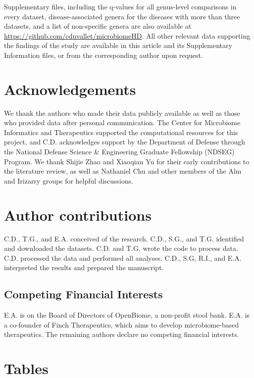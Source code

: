 {Supplementary files, including the q-values for all genus-level comparisons in every dataset, disease-associated genera for the diseases with more than three datasets, and a list of non-specific genera are also available at \url{https://github.com/cduvallet/microbiomeHD}.
All other relevant data supporting the findings of the study are available in this article and its Supplementary Information files, or from the corresponding author upon request.

\section{Acknowledgements}

We thank the authors who made their data publicly available as well as those who provided data after personal communication.
The Center for Microbiome Informatics and Therapeutics supported the computational resources for this project, and C.D. acknowledges support by the Department of Defense through the National Defense Science \& Engineering Graduate Fellowship (NDSEG) Program.
We thank Shijie Zhao and Xiaoqian Yu for their early contributions to the literature review, as well as Nathaniel Chu and other members of the Alm and Irizarry groups for helpful discussions.

\section{Author contributions}

C.D., T.G., and E.A. conceived of the research.
C.D., S.G., and T.G. identified and downloaded the datasets.
C.D. and T.G. wrote the code to process data.
C.D. processed the data and performed all analyses.
C.D., S.G, R.I., and E.A. interpreted the results and prepared the manuscript.

\subsection{Competing Financial Interests}

E.A. is on the Board of Directors of OpenBiome, a non-profit stool bank. E.A. is a co-founder of Finch Therapeutics, which aims to develop microbiome-based therapeutics.
The remaining authors declare no competing financial interests.

\FloatBarrier

\section{Tables}

}
